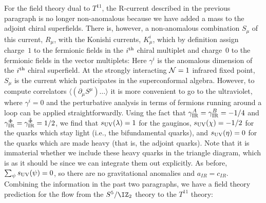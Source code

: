For the field theory dual to $T^{11}$, the R-current described in the
previous paragraph is no longer non-anomalous because we have added a mass
to the adjoint chiral superfields.  
There is, however, a non-anomalous combination $S_\mu$ of
this current, $R_\mu$, with the Konishi currents, $K^i_\mu$, which by
definition assign charge~$1$ to the fermionic
fields in the $i^{\rm th}$ chiral
multiplet and charge~$0$ to the fermionic fields in the vector multiplets:
 Here $\gamma^i$ is the anomalous dimension of the $i^{\rm th}$ chiral
superfield.  At the strongly interacting ${\cal N}=1$ infrared fixed point,
$S_\mu$ is the current which participates in the superconformal algebra.
However, to compute correlators $\langle (\partial_\mu S^\mu) \ldots
\rangle$ it is more convenient to go to the ultraviolet, where $\gamma^i =
0$ and the perturbative analysis in terms of fermions running around a loop
can be applied straightforwardly.  Using the fact that $\gamma_{\rm IR}^A =
\gamma_{\rm IR}^B = -1/4$ and $\gamma_{\rm IR}^\Phi = \gamma_{\rm
IR}^{\tilde{\Phi}} = 1/2$, we find that $s_{\rm UV}(\lambda) = 1$ for the
gauginos, $s_{\rm UV}(\chi) = -1/2$ for the quarks which stay light (i.e.,
the bifundamental quarks), and $s_{\rm UV}(\eta) = 0$ for the quarks which
are made heavy (that is, the adjoint quarks).  Note that it is immaterial
whether we include these heavy quarks in the triangle diagram, which is as
it should be since we can integrate them out explicitly.  As before,
$\sum_\psi s_{\rm UV}(\psi) = 0$, so there are no gravitational
anomalies and $a_{IR} = c_{IR}$.
Combining the information in the past two paragraphs, we have a field
theory prediction for the flow from the $S^5/\IZ_2$ theory to the
$T^{11}$ theory:

